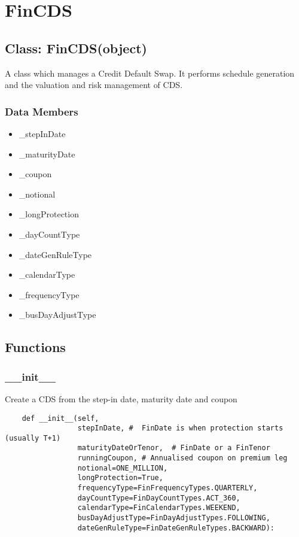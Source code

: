 \documentclass[twoside,11pt]{book}
\begin{document}
\section{FinCDS}

\subsection*{Class: FinCDS(object)}
A class which manages a Credit Default Swap. It performs schedule generation and the valuation and risk management of CDS.  

\subsubsection*{Data Members}
\begin{itemize}
\item{\_stepInDate}
\item{\_maturityDate}
\item{\_coupon}
\item{\_notional}
\item{\_longProtection}
\item{\_dayCountType}
\item{\_dateGenRuleType}
\item{\_calendarType}
\item{\_frequencyType}
\item{\_busDayAdjustType}
\end{itemize}

\subsection*{Functions}

\subsubsection*{{\bf \_\_init\_\_}}
Create a CDS from the step-in date, maturity date and coupon  

\begin{lstlisting}
    def __init__(self,
                 stepInDate, #  FinDate is when protection starts (usually T+1)
                 maturityDateOrTenor,  # FinDate or a FinTenor
                 runningCoupon, # Annualised coupon on premium leg
                 notional=ONE_MILLION,
                 longProtection=True,
                 frequencyType=FinFrequencyTypes.QUARTERLY,
                 dayCountType=FinDayCountTypes.ACT_360,
                 calendarType=FinCalendarTypes.WEEKEND,
                 busDayAdjustType=FinDayAdjustTypes.FOLLOWING,
                 dateGenRuleType=FinDateGenRuleTypes.BACKWARD):
\end{lstlisting}
\end{document}
